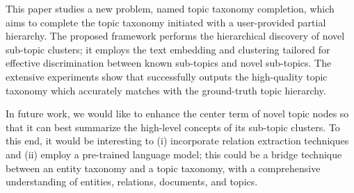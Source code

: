 This paper studies a new problem, named topic taxonomy completion, which aims to complete the topic taxonomy initiated with a user-provided partial hierarchy.
The proposed \proposed framework performs the hierarchical discovery of novel sub-topic clusters;
it employs the text embedding and clustering tailored for effective discrimination between known sub-topics and novel sub-topics.
The extensive experiments show that \proposed successfully outputs the high-quality topic taxonomy which accurately matches with the ground-truth topic hierarchy.

In future work, we would like to enhance the center term of novel topic nodes so that it can best summarize the high-level concepts of its sub-topic clusters.
To this end, it would be interesting to (i) incorporate relation extraction techniques and (ii) employ a pre-trained language model;
this could be a bridge technique between an entity taxonomy and a topic taxonomy, with a comprehensive understanding of entities, relations, documents, and topics.